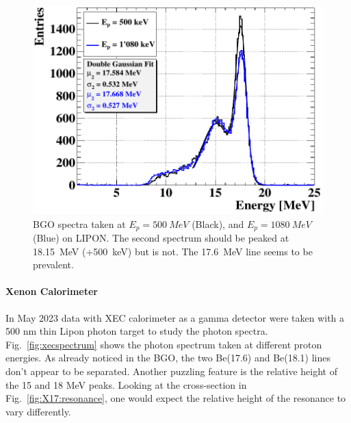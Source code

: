 \begin{refsection}
        \begin{figure}
            \centering
            \includegraphics[width=0.9\linewidth]{Figures//X17//BGO/BGO_500vs1080.png}
            \caption[X17: comparison of 500 and 1080 MeV spectra]{BGO spectra taken at $E_p=\SI{500}{MeV}$ (Black), and $E_p=\SI{1080}{MeV}$ (Blue) on LIPON. The second spectrum should be peaked at \SI{18.15}{MeV} (+\SI{500}{keV}) but is not. The \SI{17.6}{MeV} line seems to be prevalent.}
            \label{fig:BGO:500vs1080}
        \end{figure}

        
        \paragraph{Xenon Calorimeter} 
        In May 2023 data with XEC calorimeter as a gamma detector were taken with a 500 nm thin Lipon photon target to study the photon spectra.
        Fig.~\ref{fig:xecspectrum} shows the photon spectrum taken at different proton energies. As already noticed in the BGO, the two Be(17.6) and Be(18.1) lines don't appear to be separated.
        Another puzzling feature is the relative height of the 15 and 18 MeV peaks.
        Looking at the cross-section in Fig.~\ref{fig:X17:resonance}, one would expect the relative height of the resonance to vary differently.
        

\end{refsection}
